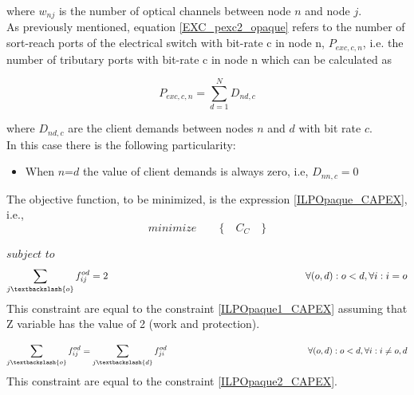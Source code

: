 \vspace{11pt}
\noindent
where $w_{nj}$ is the number of optical channels between node $n$ and node $j$.\\

As previously mentioned, equation \ref{EXC_pexc2_opaque} refers to the number of sort-reach ports of the electrical switch with bit-rate c in node n, $P_{exc,c,n}$, i.e. the number of tributary ports with bit-rate c in node n which can be calculated as

\begin{equation}
P_{exc,c,n} = \sum_{d=1}^{N} D_{nd,c}
\label{EXC_pexc2_opaquep}
\end{equation}

\vspace{11pt}
\noindent
where $D_{nd,c}$ are the client demands between nodes $n$ and $d$ with bit rate $c$.\\

In this case there is the following particularity:

\begin{itemize}
  \item When $n$=$d$ the value of client demands is always zero, i.e, $D_{nn,c}=0$
\end{itemize}


\vspace{17pt}
The objective function, to be minimized, is the expression \ref{ILPOpaque_CAPEX}, i.e.,
\begin{equation*}
  minimize \qquad \Big\{ \quad C_C \quad \Big\}
\end{equation*}

$subject$ $to$
\begin{equation}
\sum_{j\textbackslash \{o\}} f_{ij}^{od} = 2  \qquad \qquad \qquad \qquad \qquad \qquad \qquad \qquad \qquad \qquad
\forall(o,d) : o < d, \forall i: i = o
\label{ILPOpaque1}
\end{equation}
\noindent
This constraint are equal to the constraint \ref{ILPOpaque1_CAPEX} assuming that Z variable has the value of 2 (work and protection).

\begin{equation}
\sum_{j\textbackslash \{o\}} f_{ij}^{od} = \sum_{j\textbackslash \{d\}} f_{ji}^{od}   \qquad \qquad \qquad \qquad \qquad \qquad \qquad \qquad
\forall(o,d) : o < d, \forall i: i \neq o,d
\label{ILPOpaque2}
\end{equation}
\noindent
This constraint are equal to the constraint \ref{ILPOpaque2_CAPEX}.

